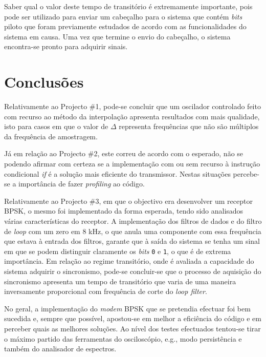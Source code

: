 \documentclass[11pt]{article}
\numberwithin{equation}{section}
\begin{document}
Saber qual o valor deste tempo de transitório é extremamente importante, pois pode ser utilizado para enviar um cabeçalho para o sistema que contém \textit{bits} piloto que foram previamente estudados de acordo com as funcionalidades do sistema em causa. Uma vez que termine o envio do cabeçalho, o sistema encontra-se pronto para adquirir sinais.

\pagebreak

\section{Conclusões}

Relativamente ao Projecto \#1, pode-se concluir que um oscilador controlado feito com recurso ao método da interpolação apresenta resultados com mais qualidade, isto para casos em que o valor de $\Delta$ representa frequências que não são múltiplos da frequência de amostragem. 

Já em relação ao Projecto \#2, este correu de acordo com o esperado, não se podendo afirmar com certeza se a implementação com ou sem recurso à instrução condicional \textit{if} é a solução mais eficiente do transmissor. Nestas situações percebe-se a importância de fazer \textit{profiling} ao código.

Relativamente ao Projecto \#3, em que o objectivo era desenvolver um receptor BPSK, o mesmo foi implementado da forma esperada, tendo sido analisados várias características do receptor. A implementação dos filtros de dados e do filtro de \textit{loop} com um zero em 8 kHz, o que anula uma componente com essa frequência que estava à entrada dos filtros, garante que à saída do sistema se tenha um sinal em que se podem distinguir claramente os \textit{bits} \texttt{0} e \texttt{1}, o que é de extrema importância. Em relação ao regime transitório, onde é avaliada a capacidade do sistema adquirir o sincronismo, pode-se concluir-se que o processo de aquisição do sincronismo apresenta um tempo de transitório que varia de uma maneira inversamente proporcional com frequência de corte do \textit{loop filter}. 

No geral, a implementação do \textit{modem} BPSK que se pretendia efectuar foi bem sucedida e, sempre que possível, apostou-se em melhor a eficiência do código e em perceber quais as melhores soluções. Ao nível dos testes efectuados tentou-se tirar o máximo partido das ferramentas do osciloscópio, e.g., modo persistência e também do analisador de espectros.

\pagebreak
\end{document}
